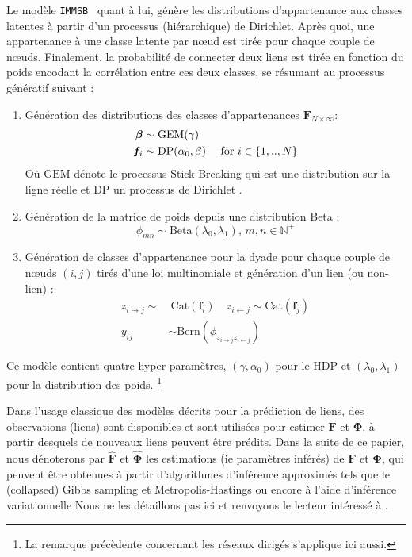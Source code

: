 \documentclass[french]{hermes-journal}
\renewcommand{\text}{\textnormal}
\newcommand{\immsb}{\texttt{IMMSB}}
\newcommand{\gem}{\mathrm{GEM}}
\newcommand{\DP}{\mathrm{DP}}
\newcommand{\mat}[1]{\bm{#1}}
\begin{document}
Le modèle \immsb~ quant à lui, génère les distributions d'appartenance aux classes latentes à partir d'un processus (hiérarchique) de Dirichlet. Après quoi, une appartenance à une classe latente par n\oe{}ud est tirée pour chaque couple de n\oe{}uds. Finalement, la probabilité de connecter deux liens est tirée en fonction du poids encodant la corrélation entre ces deux classes, se résumant au processus génératif suivant :
\begin{enumerate}
\item Génération des distributions des classes d'appartenances $\mat{F}_{N \times \infty}$:
   \begin{align}
       \bm{\beta} &\sim \gem(\gamma) \nonumber \\
    \mat{f}_i &\sim \DP(\alpha_0, \beta) \quad\text{ for }  i \in \{1, .., N\} \nonumber
   \end{align}  Où $\gem$ dénote le processus Stick-Breaking qui est une distribution sur la ligne réelle et $\DP$ un processus de Dirichlet \cite{HDP}.
\item Génération de la matrice de poids depuis une distribution Beta :\\
\[ \phi_{mn} \sim \mathrm{Beta}(\lambda_0,\lambda_1), \, m,n \in \mathbb{N}^{+} \]
\item Génération de classes d'appartenance pour la dyade pour chaque couple de n\oe{}uds $(i,j)$ tirés d'une loi multinomiale et génération d'un lien (ou non-lien) : 
   \begin{align}
       z_{i \rightarrow j} \sim&\ \mbox{Cat}(\mat{f}_i) \quad z_{i \leftarrow j} \sim \mbox{Cat}(\mat{f}_j) \nonumber \\
       y_{ij} &\sim \mathrm{Bern}(\phi_{z_{i \rightarrow j}z_{i \leftarrow j}}) \nonumber
    \label{eq:link-immsb}
   \end{align}
\end{enumerate}


Ce modèle contient quatre hyper-paramètres, $(\gamma, \alpha_0)$ pour le HDP et $(\lambda_0, \lambda_1)$ pour la distribution des poids. \footnote{La remarque précèdente concernant les réseaux dirigés s'applique ici aussi.}

Dans l'usage classique des modèles décrits pour la prédiction de liens, des observations (liens) sont disponibles et sont utilisées pour estimer  $\mat{F}$ et $\mat{\Phi}$, à partir desquels de nouveaux liens peuvent être prédits. Dans la suite de ce papier, nous dénoterons par $\mat{\hat{F}}$ et $\mat{\hat{\Phi}}$ les estimations (ie paramètres inférés) de $\mat{F}$ et $\mat{\Phi}$, qui peuvent être obtenues à partir d'algorithmes d'inférence approximés tels que le (collapsed) Gibbs sampling et Metropolis-Hastings ou encore à l'aide d'inférence variationnelle Nous ne les détaillons pas ici et renvoyons le lecteur intéressé à \cite{ILFRM,IBP,HDP,fan2015dynamic}.
\end{document}
